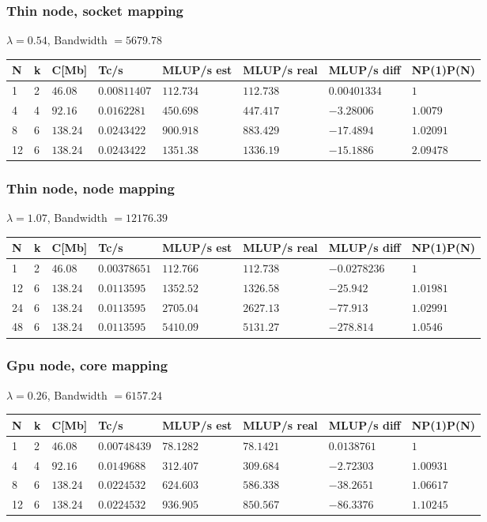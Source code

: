 \documentclass[11pt,a4paper]{report}
\theoremstyle{definition}
\begin{document}
\subsubsection{Thin node, socket mapping} %
$\lambda = 0.54$, Bandwidth $= 5679.78$
\begin{center}
\begin{tabular}{llllllll} 
\toprule
N & k & C[Mb] & Tc/s & MLUP/s est & MLUP/s real & MLUP/s diff &NP(1)P(N) \\
\midrule
1 & 2	& $46.08 $	& $0.00811407$ 	& $112.734$ 	& $112.738$ 	& $0.00401334$ & $1$ \\
4 & 4	& $92.16$	& $0.0162281$	& $450.698$		& $447.417$		& $-3.28006$ & $1.0079$\\
8 & 6	& $138.24$	& $0.0243422$ 	& $900.918$		& $883.429$		& $-17.4894$ & $1.02091$\\
12& 6	& $138.24$	& $0.0243422$	& $1351.38$		& $1336.19$		& $-15.1886$ & $2.09478$\\
\bottomrule
\end{tabular}
\end{center}
\subsubsection{Thin node, node mapping} %
$\lambda = 1.07$, Bandwidth $= 12176.39$
\begin{center}
\begin{tabular}{llllllll}
\toprule
N & k & C[Mb] & Tc/s & MLUP/s est & MLUP/s real & MLUP/s diff &NP(1)P(N) \\
\midrule
1 & 2	& $46.08$	& $0.00378651$ 	& $112.766$	 	& $112.738$ 	& $-0.0278236$ & $1$ \\
12& 6	& $138.24$	& $0.0113595$	& $1352.52$		& $1326.58$		& $-25.942$ & $1.01981$\\
24& 6	& $138.24$	& $0.0113595$ 	& $2705.04$		& $2627.13$		& $-77.913$ & $1.02991$\\
48& 6	& $138.24$	& $0.0113595$	& $5410.09$		& $5131.27$		& $-278.814$ & $1.0546$\\
\bottomrule
\end{tabular}
\end{center}
\subsubsection{Gpu node, core mapping} 
$\lambda = 0.26$, Bandwidth $= 6157.24$
\begin{center}
\begin{tabular}{llllllll} %
\toprule
N & k & C[Mb] & Tc/s & MLUP/s est & MLUP/s real & MLUP/s diff &NP(1)P(N) \\
\midrule
1 &2	& $46.08$	& $0.00748439$ 	& $78.1282$ 	& $78.1421$ 	& $0.0138761$ & $1$ \\
4&4		& $92.16$	& $0.0149688$	& $312.407$		& $309.684$		& $-2.72303$ & $1.00931$\\
8&6		& $138.24$	& $0.0224532$ 	& $624.603$		& $586.338$		& $-38.2651$ & $1.06617$\\
12&6	& $138.24$	& $0.0224532$	& $936.905$		& $850.567$		& $-86.3376$ & $1.10245$\\
\bottomrule
\end{tabular}
\end{center}
\end{document}
